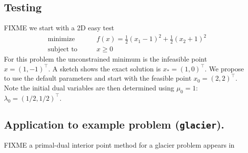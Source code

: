 \documentclass[11pt]{article}
\begin{document}
\subsection*{Testing}

FIXME we start with a 2D easy test
\begin{equation}
\begin{matrix}
\text{minimize} \qquad & f(x) = \frac{1}{2} (x_1-1)^2 + \frac{1}{2} (x_2+1)^2 \\
\text{subject to} \qquad & x \ge 0
\end{matrix} \label{testoneproblem}
\end{equation}
For this problem the unconstrained minimum is the infeasible point $\hat x =(1,-1)^\top$.  A sketch shows the exact solution is $x_*=(1,0)^\top$.  We propose to use the default parameters and start with the feasible point $x_0=(2,2)^\top$.  Note the initial dual variables are then determined using $\mu_0=1$: $\lambda_0=(1/2,1/2)^\top$.


\subsection*{Application to example problem (\texttt{glacier}).}

FIXME a primal-dual interior point method for a glacier problem appears in \cite{Calvoetal2003}




\end{document}
